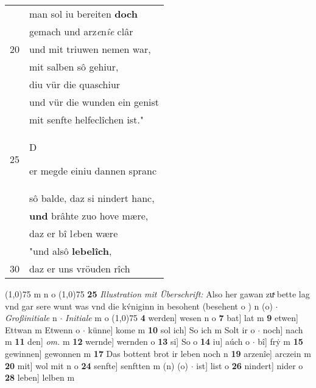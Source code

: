 \documentclass[8pt,a4paper,notitlepage]{article}
\begin{document}
\begin{table}[ht]
\begin{minipage}[t]{0.5\linewidth}
\begin{tabular}{rl}
 & man sol iu bereiten \textbf{doch}\\ 
 & gemach und arz\textit{e}n\textit{îe} clâr\\ 
20 & und mit triuwen nemen war,\\ 
 & mit salben sô gehiur,\\ 
 & diu vür die quaschiur\\ 
 & und vür die wunden ein genist\\ 
 & mit senfte helfeclîchen ist."\\ 
25 & \begin{large}D\end{large}er megde einiu dannen spranc\\ 
 & sô balde, daz si nindert hanc,\\ 
 & \textbf{und} brâhte zuo hove mære,\\ 
 & daz er bî l\textit{e}ben wære\\ 
 & "und alsô \textbf{lebelîch},\\ 
30 & daz er uns vröuden rîch\\ 
\end{tabular}
\scriptsize
\line(1,0){75} \newline
m n o \newline
\line(1,0){75} \newline
\textbf{25} \textit{Illustration mit Überschrift:} Also her gawan zuͯ bette lag vnd gar sere wunt was vnd die kv́niginn in besohent (besehent o  ) n (o)   $\cdot$ \textit{Großinitiale} n   $\cdot$ \textit{Initiale} m o  \newline
\line(1,0){75} \newline
\textbf{4} werden] wesen n o \textbf{7} bat] lat m \textbf{9} etwen] Ettwan m Etwenn o  $\cdot$ künne] kome m \textbf{10} sol ich] So ich m Solt ir o  $\cdot$ noch] nach m \textbf{11} den] \textit{om.} m \textbf{12} wernde] wernden o \textbf{13} si] So o \textbf{14} iu] aúch o  $\cdot$ bî] frẏ m \textbf{15} gewinnen] gewonnen m \textbf{17} Das bottent brot ir leben noch n \textbf{19} arzenîe] arczein m \textbf{20} mit] wol mit n o \textbf{24} senfte] senftten m (n) (o)  $\cdot$ ist] list o \textbf{26} nindert] nider o \textbf{28} leben] lelben m \newline
\end{minipage}
\end{table}
\newpage
\end{document}
